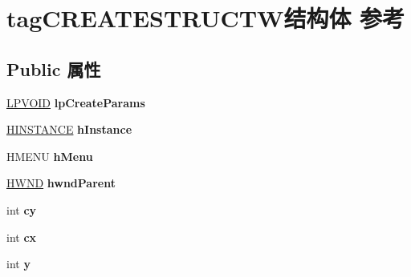 \hypertarget{structtag_c_r_e_a_t_e_s_t_r_u_c_t_w}{}\section{tag\+C\+R\+E\+A\+T\+E\+S\+T\+R\+U\+C\+T\+W结构体 参考}
\label{structtag_c_r_e_a_t_e_s_t_r_u_c_t_w}
\subsection*{Public 属性}
\begin{DoxyCompactItemize}
\item 
\mbox{\label{structtag_c_r_e_a_t_e_s_t_r_u_c_t_w_a76a6f22cef1ea5936e161de987d3eef2}} 
\hyperlink{interfacevoid}{L\+P\+V\+O\+ID} {\bfseries lp\+Create\+Params}
\item 
\mbox{\label{structtag_c_r_e_a_t_e_s_t_r_u_c_t_w_a8131e3a49d5b9ece6356ba3b72a5d3ad}} 
\hyperlink{interfacevoid}{H\+I\+N\+S\+T\+A\+N\+CE} {\bfseries h\+Instance}
\item 
\mbox{\label{structtag_c_r_e_a_t_e_s_t_r_u_c_t_w_ababf13605c647fbfc5bc58fd699dc6be}} 
H\+M\+E\+NU {\bfseries h\+Menu}
\item 
\mbox{\label{structtag_c_r_e_a_t_e_s_t_r_u_c_t_w_a56d37952f1f8030188b2cf2789244641}} 
\hyperlink{interfacevoid}{H\+W\+ND} {\bfseries hwnd\+Parent}
\item 
\mbox{\label{structtag_c_r_e_a_t_e_s_t_r_u_c_t_w_a6c95b5a2d104f70dd43252e706ffc463}} 
int {\bfseries cy}
\item 
\mbox{\label{structtag_c_r_e_a_t_e_s_t_r_u_c_t_w_a7292dee2ce39e5699d35a7740d6091ca}} 
int {\bfseries cx}
\item 
\mbox{\label{structtag_c_r_e_a_t_e_s_t_r_u_c_t_w_a0768f76e107cd0cce22f3b860883558f}} 
int {\bfseries y}
\item 
\mbox{\label{structtag_c_r_e_a_t_e_s_t_r_u_c_t_w_a51e5fc7e44969a88fd7376932f363c49}} 

\end{DoxyCompactItemize}
